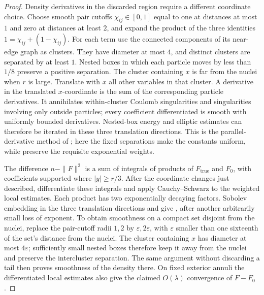 \begin{proof}
Density derivatives in the discarded region require a different
coordinate choice.  Choose smooth pair cutoffs \(\chi_{ij}\in[0,1]\)
equal to one at distances at most \(1\) and zero at distances at least
\(2\), and expand the product of the three identities
\(1=\chi_{ij}+(1-\chi_{ij})\).
For each term use the connected components of its near-edge graph
as clusters.  They have diameter at most \(4\), and distinct clusters
are separated by at least \(1\).  Nested boxes in which each
particle moves by less than \(1/8\) preserve a positive separation.
The cluster containing \(x\) is far from the nuclei when \(r\) is large.
Translate with \(x\) all other
variables in that cluster.  A derivative in the translated
\(x\)-coordinate is the sum of the corresponding particle
derivatives.  It annihilates within-cluster Coulomb singularities
and singularities involving only outside particles; every
coefficient differentiated is smooth with uniformly bounded
derivatives.  Nested-box energy and elliptic estimates can
therefore be iterated in these three translation directions.
This is the parallel-derivative method of
\cite[preprint version, Proposition~1.10 and Section~6]{FS18}; here the fixed
separations make the constants uniform, while
preserve the requisite exponential weights.

The difference \(n-\|F\|^2\) is a sum of integrals of products of
\(F_{\mathrm{true}}\) and \(F_0\), with coefficients supported where
\(|y|\geq r/3\).  After the coordinate changes just described,
differentiate these integrals and apply Cauchy--Schwarz to the
weighted local estimates.  Each product has two exponentially
decaying factors.  Sobolev embedding in the three translation
directions and  give
, after another arbitrarily small
loss of exponent.  To obtain smoothness on a compact set disjoint from
the nuclei, replace the pair-cutoff radii \(1,2\) by
\(\varepsilon,2\varepsilon\), with \(\varepsilon\) smaller than one
sixteenth of the set's distance from the nuclei.  The cluster containing
\(x\) has diameter at most \(4\varepsilon\); sufficiently small nested
boxes therefore keep it away from the nuclei and preserve the
intercluster separation.  The same argument without discarding a tail
then proves smoothness of the density there.
On fixed exterior annuli the differentiated local estimates also
give the claimed \(O(\lambda)\) convergence of \(F-F_0\).
\end{proof}

